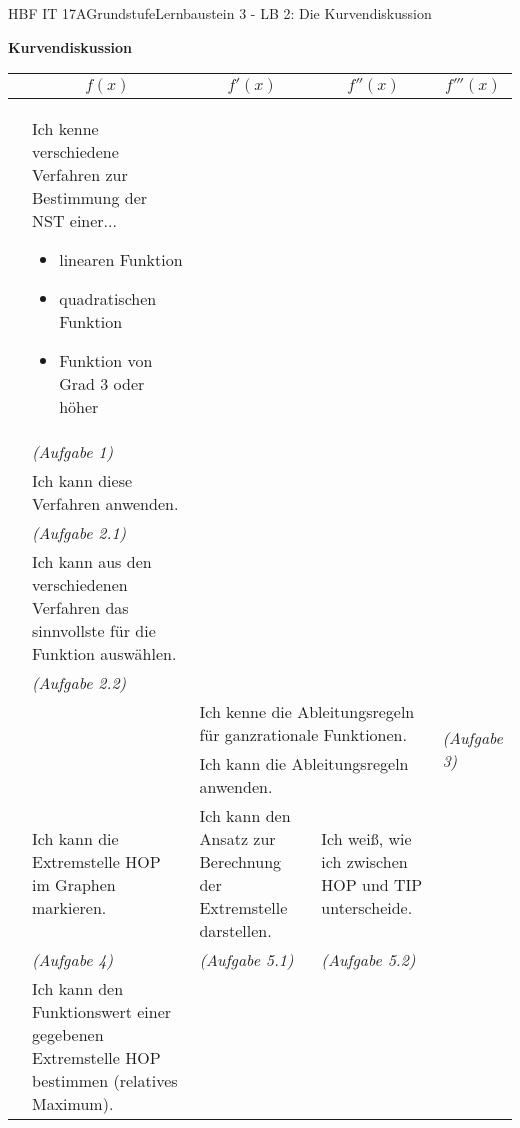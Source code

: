 \documentclass[oneside,openany,headings=optiontotoc,12pt,numbers=noenddot]{scrreprt}
\begin{document}
	\begin{worksheet}{HBF IT 17A}{Grundstufe}{Lernbaustein 3 - LB 2: Die Kurvendiskussion}
		\begin{framed}
			\begin{center}
				\textbf{Kurvendiskussion}
			\end{center}
			\tiny
			\raggedright
			\begin{tabularx}{\textwidth}{l|X|X|X|X|}
				\cline{2-5}
				& \multicolumn{1}{|c|}{\normalsize\(f(x)\)} & \multicolumn{1}{c|}{\normalsize\(f'(x)\)} & \multicolumn{1}{c|}{\normalsize\(f''(x)\)} & \multicolumn{1}{c|}{\normalsize\(f'''(x)\)}\\
				\hline\hline
				& Ich kenne verschiedene Verfahren zur Bestimmung der NST einer...
				\begin{itemize}
					\item linearen Funktion
					\item quadratischen Funktion
					\item Funktion von Grad 3 oder höher
				\end{itemize} & & &\\
				& \textit{(Aufgabe 1)} & & &\\
				\cline{2-2}
				\multirow{2}{*}{\tabrotate{Nullstellen}}
				& Ich kann diese Verfahren anwenden. & & &\\
				& \textit{(Aufgabe 2.1)} & & &\\
				\cline{2-2}
				& Ich kann aus den verschiedenen Verfahren das sinnvollste für die Funktion auswählen. & & &\\
				& \textit{(Aufgabe 2.2)} & & &\\
				\hline\hline
				& & \multicolumn{2}{l}{Ich kenne die Ableitungsregeln für ganzrationale Funktionen.} & \multirow{2}{*}{\textit{(Aufgabe 3)}}\\
				\cline{3-4}
				& & \multicolumn{2}{l}{Ich kann die Ableitungsregeln anwenden.} &\\
				\hline\hline
				& Ich kann die Extremstelle HOP im Graphen markieren.& Ich kann den Ansatz zur Berechnung der Extremstelle darstellen.& Ich weiß, wie ich zwischen HOP und TIP unterscheide.& \\
				& \textit{(Aufgabe 4)} & \textit{(Aufgabe 5.1)} & \textit{(Aufgabe 5.2)} &\\
				\cline{2-2}
				\multirow{2}{*}{\tabrotate{Extremstelle HOP}}
				& Ich kann den Funktionswert einer gegebenen Extremstelle HOP bestimmen (\colorbox{blue!5}{relatives Maximum}).& & &\\

\end{tabularx}
\end{framed}
\end{worksheet}
\end{document}
